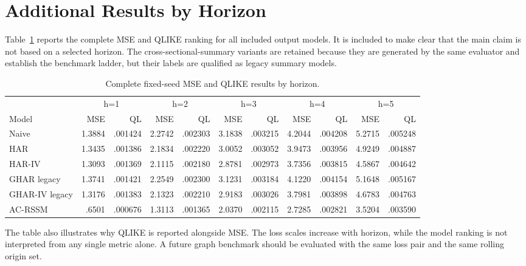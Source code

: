 \documentclass[11pt]{article}
\begin{document}
\section{Additional Results by Horizon}
Table~\ref{tab:fullmse} reports the complete MSE and QLIKE ranking for all included output models. It is included to make clear that the main claim is not based on a selected horizon. The cross-sectional-summary variants are retained because they are generated by the same evaluator and establish the benchmark ladder, but their labels are qualified as legacy summary models.
\begin{table}[h]
\centering
\caption{Complete fixed-seed MSE and QLIKE results by horizon.}
\label{tab:fullmse}
\scriptsize
\begin{tabular}{lrrrrrrrrrr}
\toprule
& \multicolumn{2}{c}{h=1} & \multicolumn{2}{c}{h=2} & \multicolumn{2}{c}{h=3} & \multicolumn{2}{c}{h=4} & \multicolumn{2}{c}{h=5}\\
Model & MSE & QL & MSE & QL & MSE & QL & MSE & QL & MSE & QL\\
\midrule
Naive & 1.3884 & .001424 & 2.2742 & .002303 & 3.1838 & .003215 & 4.2044 & .004208 & 5.2715 & .005248\\
HAR & 1.3435 & .001386 & 2.1834 & .002220 & 3.0052 & .003052 & 3.9473 & .003956 & 4.9249 & .004887\\
HAR-IV & 1.3093 & .001369 & 2.1115 & .002180 & 2.8781 & .002973 & 3.7356 & .003815 & 4.5867 & .004642\\
GHAR legacy & 1.3741 & .001421 & 2.2549 & .002300 & 3.1231 & .003184 & 4.1220 & .004154 & 5.1648 & .005167\\
GHAR-IV legacy & 1.3176 & .001383 & 2.1323 & .002210 & 2.9183 & .003026 & 3.7981 & .003898 & 4.6783 & .004763\\
AC-RSSM & .6501 & .000676 & 1.3113 & .001365 & 2.0370 & .002115 & 2.7285 & .002821 & 3.5204 & .003590\\
\bottomrule
\end{tabular}
\end{table}

The table also illustrates why QLIKE is reported alongside MSE. The loss scales increase with horizon, while the model ranking is not interpreted from any single metric alone. A future graph benchmark should be evaluated with the same loss pair and the same rolling origin set.
\end{document}
